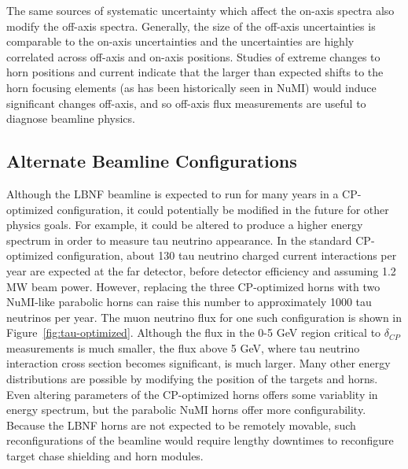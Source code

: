 
The same sources of systematic uncertainty which affect the on-axis spectra also modify the off-axis spectra.  Generally, the size of the off-axis uncertainties is comparable to the on-axis uncertainties and the uncertainties are highly correlated across off-axis and on-axis positions. Studies of extreme changes to horn positions and current indicate that the larger than expected shifts to the horn focusing elements (as has been historically seen in NuMI) would induce significant changes off-axis, and so off-axis flux measurements are useful to diagnose beamline physics.



\subsection{Alternate Beamline Configurations}

Although the LBNF beamline is expected to run for many years in a CP-optimized configuration, it could potentially be modified in the future for other physics goals.  For example, it could be altered to produce a higher energy spectrum in order to measure tau neutrino appearance.  In the standard CP-optimized configuration, about 130 tau neutrino charged current interactions per year are expected at the far detector, before detector efficiency and assuming 1.2 MW beam power.  However, replacing the three CP-optimized horns with two NuMI-like parabolic horns can raise this number to approximately 1000 tau neutrinos per year.  The muon neutrino flux for one such configuration is shown in Figure~\ref{fig:tau-optimized}.  Although the flux in the 0-5 GeV region critical to $\delta_{CP}$ measurements is much smaller, the flux above 5 GeV, where tau neutrino interaction cross section becomes significant, is much larger.  Many other energy distributions are possible by modifying the position of the targets and horns.  Even altering parameters of the CP-optimized horns offers some variablity in energy spectrum, but the parabolic NuMI horns offer more configurability.  Because the LBNF horns are not expected to be remotely movable, such reconfigurations of the beamline would require lengthy downtimes to reconfigure target chase shielding and horn modules.   

